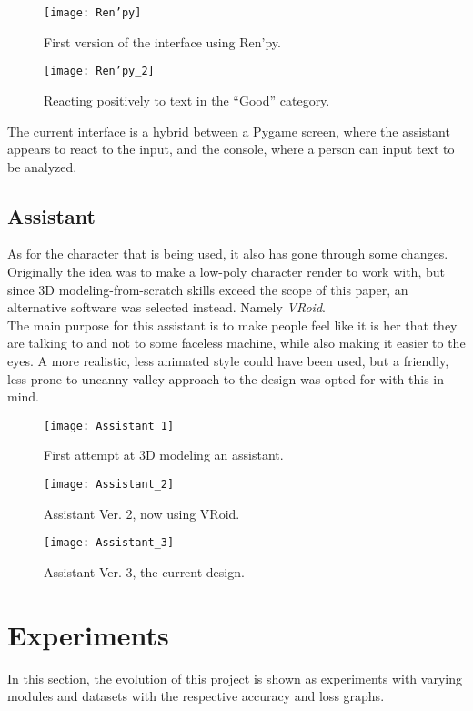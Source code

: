 \begin{figure}[!h]
	\centering
	\texttt{[image: Ren'py]}
	\caption{First version of the interface using Ren'py.}
	\label{fig:renpy_test_1}
\end{figure}
\begin{figure}[!h]
	\centering
	\texttt{[image: Ren'py\_2]}
	\caption{Reacting positively to text in the ``Good'' category.}
	\label{fig:renpy_test_2}
\end{figure}

The current interface is a hybrid between a Pygame screen, where the assistant appears to react to the input, and the console, where a person can input text to be analyzed.

\subsection{Assistant}
As for the character that is being used, it also has gone through some changes. Originally the idea was to make a low-poly character render to work with, but since 3D modeling-from-scratch skills exceed the scope of this paper, an alternative software was selected instead. Namely \textit{VRoid}.\\
The main purpose for this assistant is to make people feel like it is her that they are talking to and not to some faceless machine, while also making it easier to the eyes. A more realistic, less animated style could have been used, but a friendly, less prone to uncanny valley approach to the design was opted for with this in mind.
\begin{figure}[!bht]
	\centering
	\texttt{[image: Assistant\_1]}
	\caption{First attempt at 3D modeling an assistant.}
	\label{fig:assistant1}
\end{figure}
\begin{figure}[!bht]
	\centering
	\texttt{[image: Assistant\_2]}
	\caption{Assistant Ver. 2, now using VRoid.}
	\label{fig:assistant2}
\end{figure}
\begin{figure}[!bht]
	\centering
	\texttt{[image: Assistant\_3]}
	\caption{Assistant Ver. 3, the current design.}
	\label{fig:assistant3}
\end{figure}
\pagebreak
\section{Experiments}
In this section, the evolution of this project is shown as experiments with varying modules and datasets with the respective accuracy and loss graphs.
